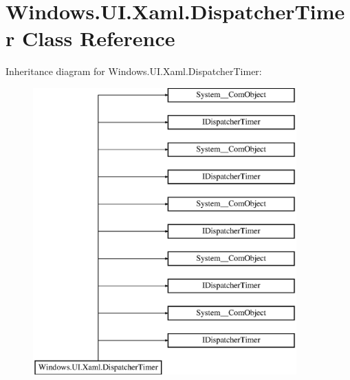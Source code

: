 \hypertarget{class_windows_1_1_u_i_1_1_xaml_1_1_dispatcher_timer}{}\section{Windows.\+U\+I.\+Xaml.\+Dispatcher\+Timer Class Reference}
\label{class_windows_1_1_u_i_1_1_xaml_1_1_dispatcher_timer}
Inheritance diagram for Windows.\+U\+I.\+Xaml.\+Dispatcher\+Timer\+:\begin{figure}[H]
\begin{center}
\leavevmode
\includegraphics[height=11.000000cm]{class_windows_1_1_u_i_1_1_xaml_1_1_dispatcher_timer}
\end{center}
\end{figure}
